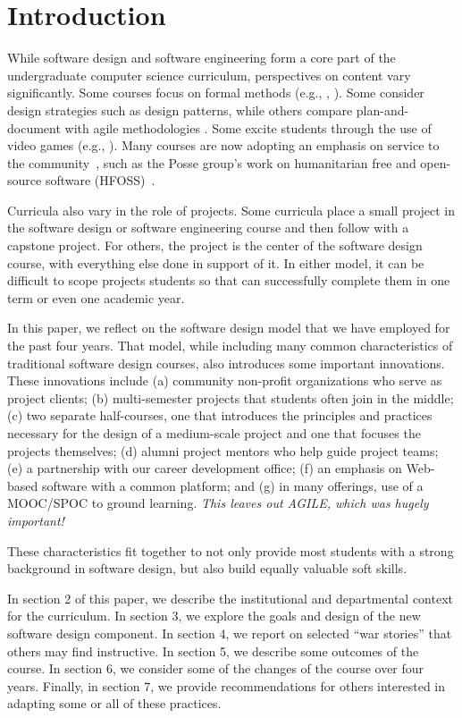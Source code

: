 
\section{Introduction}

While software design and software engineering form a core part of
the undergraduate computer science curriculum, perspectives on 
content vary significantly.  Some courses
focus on formal methods (e.g., \cite{liu-2009}, \cite{garcia-2014}).
Some consider design strategies such as design patterns, while others
compare plan-and-document with agile methodologies
\cite{gestwicki-2018}.  Some excite students through the use of
video games (e.g., \cite{wolz-2007}).  Many courses are now adopting
an emphasis on service to the community~\cite{hfoss-2018}, 
such as the Posse group's work on
humanitarian free and open-source software (HFOSS)~\cite{posse-2018}.

Curricula also vary in the role of projects.  Some curricula place
a small project in the software design or software engineering
course and then follow with a capstone project.  For others,
the project is the center of the software design course, with
everything else done in support of it. In either model, it can be difficult to 
scope projects students so that can successfully complete them
in one term or even one academic year.

In this paper, we reflect on the software design model that we have
employed for the past four years.  That model, while including many
common characteristics of traditional software design courses, also
introduces some important innovations.  These innovations include
(a) community non-profit organizations who serve as project clients;
(b) multi-semester projects that students often join in the middle;
(c) two separate half-courses, one that introduces
the principles and practices necessary for the design of a medium-scale
project and one that focuses the projects themselves; 
(d) alumni project mentors who help guide project teams; 
(e) a partnership with our career development office; 
(f) an emphasis on Web-based software with a common platform; and 
(g) in many offerings, use of a MOOC/SPOC to ground learning.
\textit{This leaves out AGILE, which was hugely important!}

These characteristics fit together to not only provide
most students with a strong background in software design, but also
build equally valuable soft skills.

In section 2 of this paper, we describe the institutional and
departmental context for the curriculum.  In section 3, we explore
the goals and design of the new software design component.  In
section 4, we report on selected ``war stories'' that others may
find instructive.  In section 5, we describe some outcomes of the
course.  In section 6, we consider some of the changes of the course
over four years.  Finally, in section 7, we provide recommendations
for others interested in adapting some or all of these practices.

